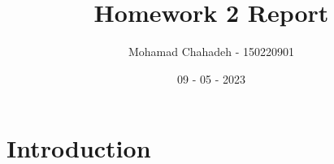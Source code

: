 \documentclass[pdftex,12pt,a4paper]{article}
\title{Homework 2 Report}
\author{Mohamad Chahadeh - 150220901}
\date{09 - 05 - 2023}
\begin{document}
\maketitle

\section{Introduction}
\end{document}
